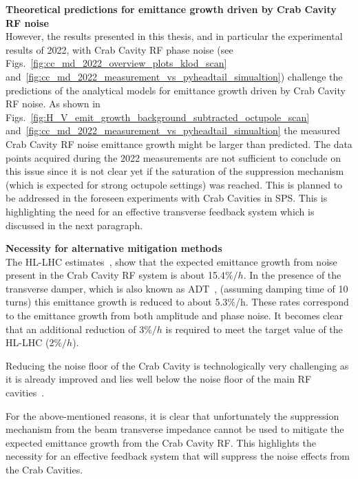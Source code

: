 \textbf{Theoretical predictions for emittance growth driven by Crab Cavity RF noise}\\
However, the results presented in this thesis, and in particular the experimental results of 2022, with Crab Cavity RF phase noise (see Figs.~\ref{fig:cc_md_2022_overview_plots_klod_scan} and~\ref{fig:cc_md_2022_measurement_vs_pyheadtail_simualtion}) challenge the predictions of the analytical models for emittance growth driven by Crab Cavity RF noise. As shown in Figs.~\ref{fig:H_V_emit_growth_background_subtracted_octupole_scan} and~\ref{fig:cc_md_2022_measurement_vs_pyheadtail_simualtion} the measured Crab Cavity RF noise emittance growth might be larger than predicted. The data points acquired during the 2022 measurements are not sufficient to conclude on this issue since it is not clear yet if the saturation of the suppression mechanism (which is expected for strong octupole settings) was reached. This is planned to be addressed in the foreseen experiments with Crab Cavities in SPS. This is highlighting the need for an effective transverse feedback system which is discussed in the next paragraph.

\textbf{Necessity for alternative mitigation methods}\\
The HL-LHC estimates~\cite{cc_noise_hl_lhc_estimates}, show that the expected emittance growth from noise present in the Crab Cavity RF system is about 15.4$\%/h$. In the presence of the transverse damper, which is also known as ADT~\cite{lhc_adt_info_presentation}, (assuming damping time of 10 turns) this emittance growth is reduced to about 5.3$\%$/h. These rates correspond to the emittance growth from both amplitude and phase noise. It becomes clear that an additional reduction of 3$\%/h$ is required to meet the target value of the HL-LHC (2$\%/h$).

Reducing the noise floor of the Crab Cavity is technologically very challenging as it is already improved and lies well below the noise floor of the main RF cavities~\cite{cc_noise_hl_lhc_estimates}. %

For the above-mentioned reasons, it is clear that unfortunately the suppression mechanism from the beam transverse impedance cannot be used to mitigate the expected emittance growth from the Crab Cavity RF. This highlights the necessity for an effective feedback system that will suppress the noise effects from the Crab Cavities. 

